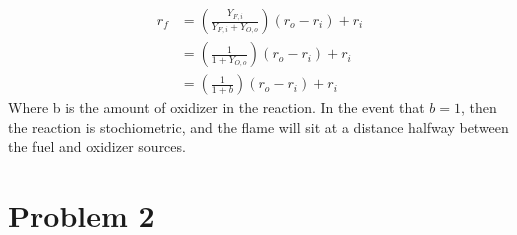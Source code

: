 \documentclass{article}
\begin{document}
\begin{eqnarray*}
 r_f &= \left(\frac{Y_{F,i}}{Y_{F,i} + Y_{O,o}} \right)(r_o - r_i) + r_i \\
     &= \left(\frac{1}{1 + Y_{O,o}} \right)(r_o - r_i) + r_i \\
     &= \left(\frac{1}{1 + b} \right)(r_o - r_i) + r_i 
\end{eqnarray*}
Where b is the amount of oxidizer in the reaction. In the event that
$b=1$, then the reaction is stochiometric, and the flame will sit at a
distance halfway between the fuel and oxidizer sources. 

\newpage
\section*{Problem 2}
\end{document}
